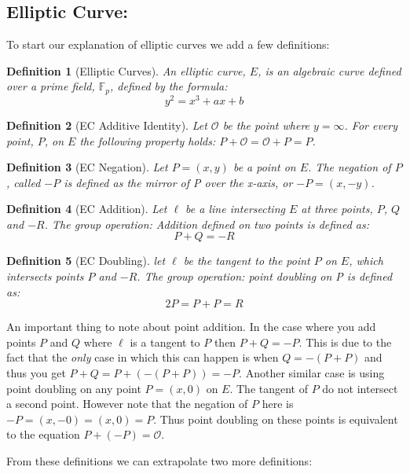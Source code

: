 \documentclass{article}
\newtheorem{definition}{Definition}[section]
\renewcommand{\O}{\mathcal{O}}
\newcommand{\F}{\mathbb{F}}
\begin{document}
\subsection{Elliptic Curve:}\label{elliptic-curves}

To start our explanation of elliptic curves we add a few definitions:

\begin{definition}[Elliptic Curves]
	An elliptic curve, $E$, is an algebraic curve defined over a prime field, $\F_p$, defined by the formula:
	$$y^2 = x^3 + ax + b$$
\end{definition}

\begin{definition}[EC Additive Identity]
	Let $\O$ be the point where $y = \infty$. For every point, $P$,
	on $E$ the following property holds:
	$P + \O = \O + P = P$.
\end{definition}

\begin{definition}[EC Negation]
	Let $P = (x,y)$ be a point on $E$. The negation of $P$, called $-P$
	is defined as the mirror of P over the x-axis, or $-P = (x,-y)$.
\end{definition}

\begin{definition}[EC Addition]
	Let $\ell$ be a line intersecting $E$ at three points, $P$, $Q$ and
	$-R$. The group operation: Addition defined on two points is defined
	as:
	$$P + Q = {-R}$$
\end{definition}

\begin{definition}[EC Doubling]
	let $\ell$ be the tangent to the point $P$ on $E$, which intersects
	points $P$ and $-R$. The group operation: point doubling on P is
	defined as:
	$$2P = P + P = R$$
\end{definition}

An important thing to note about point addition. In the case where
you add points $P$ and $Q$ where $\ell$ is a tangent to $P$ then $P +
Q = -P$. This is due to the fact that the \textit{only} case in which
this can happen is when $Q = -(P + P)$ and thus you get $P + Q = P +
(-(P + P)) = -P$. Another similar case is using point doubling on any
point $P = (x,0)$ on $E$. The tangent of $P$ do not intersect
a second point. However note that the negation of $P$ here is $-P =
(x,-0) = (x,0) = P$. Thus point doubling on these points is equivalent
to the equation $P + (-P) = \O$.

From these definitions we can extrapolate two more definitions:
\end{document}
